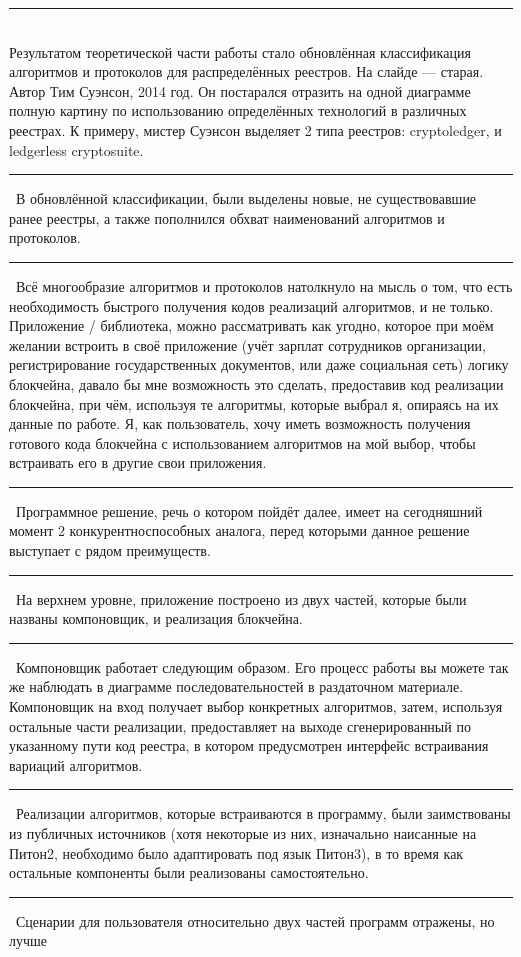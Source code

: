 \documentclass[12pt]{article}
\renewcommand{\line}{\noindent\rule{\textwidth}{1pt}}
\begin{document}
\line\\
Результатом теоретической части работы стало обновлённая классификация
алгоритмов и протоколов для распределённых реестров. На слайде --- старая.
Автор Тим Суэнсон, 2014 год. Он постарался отразить на одной диаграмме полную
картину по использованию определённых технологий в различных реестрах. К
примеру, мистер Суэнсон выделяет 2 типа реестров: cryptoledger, и ledgerless
cryptosuite.\\
\line\
В обновлённой классификации, были выделены новые, не существовавшие ранее
реестры, а также пополнился обхват наименований алгоритмов и протоколов.\\
\line\
Всё многообразие алгоритмов и протоколов натолкнуло на мысль о том, что есть
необходимость быстрого получения кодов реализаций алгоритмов, и не только.
Приложение / библиотека, можно рассматривать как угодно, которое при моём
желании встроить в своё приложение (учёт зарплат сотрудников организации,
регистрирование государственных документов, или даже социальная сеть) логику
блокчейна, давало бы мне возможность это сделать, предоставив код реализации
блокчейна, при чём, используя те алгоритмы, которые выбрал я, опираясь на их
данные по работе. Я, как пользователь, хочу иметь возможность получения
готового кода блокчейна с использованием алгоритмов на мой выбор, чтобы
встраивать его в другие свои приложения.
\line\
Программное решение, речь о котором пойдёт далее, имеет на сегодняшний момент 2
конкурентноспособных аналога, перед которыми данное решение выступает с рядом
преимуществ.\\
\line\
На верхнем уровне, приложение построено из двух частей, которые были названы
компоновщик, и реализация блокчейна.\\
\line\
Компоновщик работает следующим образом. Его процесс работы вы можете так же
наблюдать в диаграмме последовательностей в раздаточном материале. Компоновщик
на вход получает выбор конкретных алгоритмов, затем, используя остальные части
реализации, предоставляет на выходе сгенерированный по указанному пути код
реестра, в котором предусмотрен интерфейс встраивания вариаций алгоритмов.\\
\line\
Реализации алгоритмов, которые встраиваются в программу, были заимствованы из
публичных источников (хотя некоторые из них, изначально наисанные на Питон2,
необходимо было адаптировать под язык Питон3), в то время как остальные
компоненты были реализованы самостоятельно.\\
\line\
Сценарии для пользователя относительно двух частей программ отражены, но лучше
\end{document}
